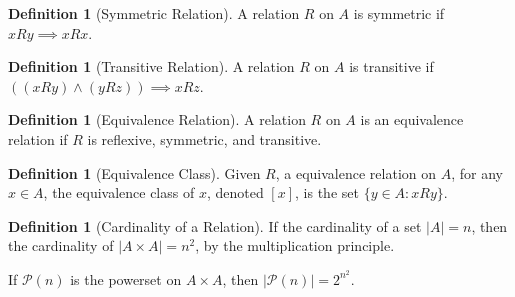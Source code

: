 \documentclass[10pt]{article}
\theoremstyle{definition}
\newtheorem{definition}[equation]{Definition}
\begin{document}
\begin{definition}[Symmetric Relation]
  A relation $R$ on $A$ is symmetric if $xRy\implies xRx$.
\end{definition}

\begin{definition}[Transitive Relation]
  A relation $R$ on $A$ is transitive if $((xRy)\land(yRz))\implies xRz$.
\end{definition}

\begin{definition}[Equivalence Relation]
  A relation $R$ on $A$ is an equivalence relation if $R$ is reflexive, symmetric, and transitive.
\end{definition}

\begin{definition}[Equivalence Class]
  Given $R$, a equivalence relation on $A$, for any $x\in A$, the equivalence class of $x$, denoted $[x]$, is the set $\{y\in A: xRy\}$.
\end{definition}

\begin{definition}[Cardinality of a Relation]
  If the cardinality of a set $|A|=n$, then the cardinality of $|A\times A| = n^2$, by the multiplication principle.

  If $\mathcal{P}(n)$ is the powerset on $A\times A$, then $|\mathcal{P}(n)| = 2^n^2$.
\end{definition}
\end{document}
